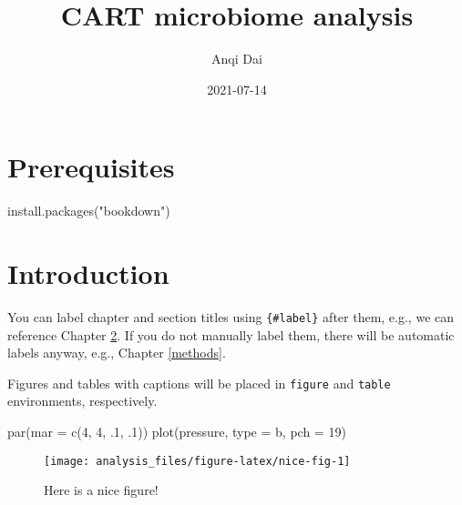 \documentclass[
]{book}
\title{CART microbiome analysis}
\author{Anqi Dai}
\date{2021-07-14}
\newenvironment{Shaded}{\begin{snugshade}}{\end{snugshade}}
\newcommand{\AttributeTok}[1]{\textcolor[rgb]{0.77,0.63,0.00}{#1}}
\newcommand{\DecValTok}[1]{\textcolor[rgb]{0.00,0.00,0.81}{#1}}
\newcommand{\FunctionTok}[1]{\textcolor[rgb]{0.00,0.00,0.00}{#1}}
\newcommand{\NormalTok}[1]{#1}
\newcommand{\StringTok}[1]{\textcolor[rgb]{0.31,0.60,0.02}{#1}}
\begin{document}
\maketitle

{
\setcounter{tocdepth}{1}
\tableofcontents
}
\hypertarget{prerequisites}{%
\chapter{Prerequisites}\label{prerequisites}}

\begin{Shaded}
\begin{Highlighting}[]
\FunctionTok{install.packages}\NormalTok{(}\StringTok{"bookdown"}\NormalTok{)}
\end{Highlighting}
\end{Shaded}

\hypertarget{intro}{%
\chapter{Introduction}\label{intro}}

You can label chapter and section titles using \texttt{\{\#label\}} after them, e.g., we can reference Chapter \ref{intro}. If you do not manually label them, there will be automatic labels anyway, e.g., Chapter \ref{methods}.

Figures and tables with captions will be placed in \texttt{figure} and \texttt{table} environments, respectively.

\begin{Shaded}
\begin{Highlighting}[]
\FunctionTok{par}\NormalTok{(}\AttributeTok{mar =} \FunctionTok{c}\NormalTok{(}\DecValTok{4}\NormalTok{, }\DecValTok{4}\NormalTok{, .}\DecValTok{1}\NormalTok{, .}\DecValTok{1}\NormalTok{))}
\FunctionTok{plot}\NormalTok{(pressure, }\AttributeTok{type =} \StringTok{\textquotesingle{}b\textquotesingle{}}\NormalTok{, }\AttributeTok{pch =} \DecValTok{19}\NormalTok{)}
\end{Highlighting}
\end{Shaded}

\begin{figure}

{\centering \texttt{[image: analysis\_files/figure-latex/nice-fig-1]} 

}

\caption{Here is a nice figure!}\label{fig:nice-fig}
\end{figure}
\end{document}
